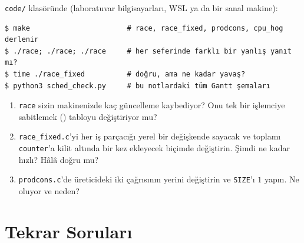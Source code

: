 \begin{tryit}
\texttt{code/} klasöründe (laboratuvar bilgisayarları, WSL ya da bir sanal makine):
\begin{lstlisting}[style=term]
$ make                       # race, race_fixed, prodcons, cpu_hog derlenir
$ ./race; ./race; ./race     # her seferinde farklı bir yanlış yanıt mı?
$ time ./race_fixed          # doğru, ama ne kadar yavaş?
$ python3 sched_check.py     # bu notlardaki tüm Gantt şemaları
\end{lstlisting}
\begin{enumerate}[leftmargin=1.4em]
  \item \texttt{race} sizin makinenizde kaç güncelleme kaybediyor? Onu tek bir işlemciye sabitlemek () tabloyu değiştiriyor mu?
  \item \texttt{race\_fixed.c}'yi her iş parçacığı yerel bir değişkende sayacak ve toplamı \texttt{counter}'a kilit altında bir kez ekleyecek biçimde değiştirin. Şimdi ne kadar hızlı? Hâlâ doğru mu?
  \item \texttt{prodcons.c}'de üreticideki iki  çağrısının yerini değiştirin ve \texttt{SIZE}'ı $1$ yapın. Ne oluyor ve neden?
\end{enumerate}
\end{tryit}

\section{Tekrar Soruları}

